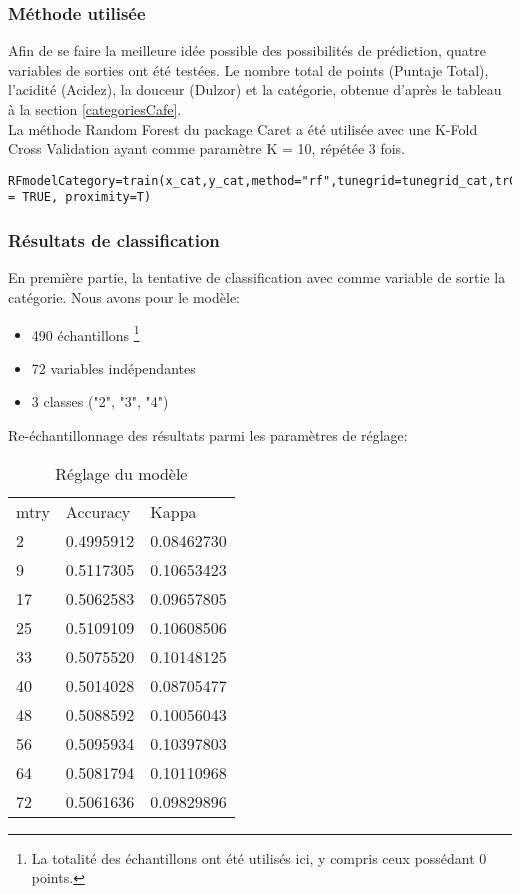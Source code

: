 \subsubsection{Méthode utilisée}
Afin de se faire la meilleure idée possible des possibilités de prédiction, quatre variables de sorties ont été testées. Le nombre total de points (Puntaje Total), l'acidité (Acidez), la douceur (Dulzor) et la catégorie, obtenue d'après le tableau à la section \ref{categoriesCafe}. \\

\noindent La méthode Random Forest du package Caret a été utilisée avec une K-Fold Cross Validation ayant comme paramètre K = 10, répétée 3 fois. 

\begin{lstlisting}[caption={Fonction d'entrainement et de test du modèle avec Random Forest},captionpos=b]
	RFmodelCategory=train(x_cat,y_cat,method="rf",tunegrid=tunegrid_cat,trControl=trainControl(method="repeatedcv",number=10,repeats=3),tuneLength=10,importance = TRUE, proximity=T)
\end{lstlisting}




\newpage
\subsubsection{Résultats de classification}
En première partie, la tentative de classification avec comme variable de sortie la catégorie. Nous avons pour le modèle:
\begin{itemize}
	\item 490 échantillons \footnote{La totalité des échantillons ont été utilisés ici, y compris ceux possédant 0 points.}
	\item 72 variables indépendantes
	\item 3 classes ("2", "3", "4")
\end{itemize}

Re-échantillonnage des résultats parmi les paramètres de réglage:

\begin{table}[H]
	\centering
	\caption{Réglage du modèle}
	\label{RF_Class_Resampling}
	\begin{tabular}{lll}
		mtry & Accuracy  & Kappa      \\
		2    & 0.4995912 & 0.08462730 \\
		9    & 0.5117305 & 0.10653423 \\
		17   & 0.5062583 & 0.09657805 \\
		25   & 0.5109109 & 0.10608506 \\
		33   & 0.5075520 & 0.10148125 \\
		40   & 0.5014028 & 0.08705477 \\
		48   & 0.5088592 & 0.10056043 \\
		56   & 0.5095934 & 0.10397803 \\
		64   & 0.5081794 & 0.10110968 \\
		72   & 0.5061636 & 0.09829896           
	\end{tabular}
\end{table}

